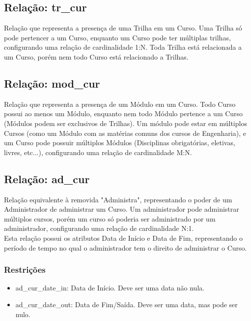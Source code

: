 \documentclass{article}
\begin{document}
  	\subsection{Relação: tr\_cur}
  	    \quad Relação que representa a presença de uma Trilha em um Curso. Uma Trilha só pode pertencer a um Curso, enquanto um Curso pode ter múltiplas trilhas, configurando uma relação de cardinalidade 1:N. Toda Trilha está relacionada a um Curso, porém nem todo Curso está relacionado a Trilhas.

  	\subsection{Relação: mod\_cur}
  	    \quad Relação que representa a presença de um Módulo em um Curso. Todo Curso possui ao menos um Módulo, enquanto nem todo Módulo pertence a um Curso (Módulos podem ser exclusivos de Trilhas).
  	    \quad Um módulo pode estar em múltiplos Cursos (como um Módulo com as matérias comuns dos cursos de Engenharia), e um Curso pode possuir múltiplos Módulos (Disciplinas obrigatórias, eletivas, livres, etc...), configurando uma relação de cardinalidade M:N.
  	
    \subsection{Relação: ad\_cur}
        \quad Relação equivalente à removida "Administra", representando o poder de um Administrador de administrar um Curso. Um administrador pode administrar múltiplos cursos, porém um curso só poderia ser administrado por um administrador, configurando uma relação de cardinalidade N:1. \\
        \quad Esta relação possui os atributos Data de Início e Data de Fim, representando o período de tempo no qual o administrador tem o direito de administrar o Curso.
        \subsubsection{Restrições}
  	        \begin{itemize}
  	            \item ad\_cur\_date\_in: Data de Início. Deve ser uma data não nula.
  	            \item ad\_cur\_date\_out: Data de Fim/Saída. Deve ser uma data, mas pode ser nulo.
  		    \end{itemize}
\end{document}
